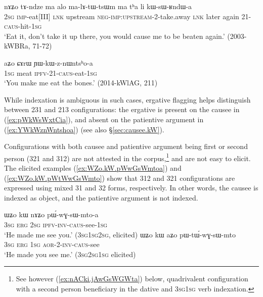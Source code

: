\begin{exe}
	\ex \label{ex:kWsWRndWa}
	\gll  nɤʑo tɤ-ndze ma alo ma-lɤ-tɯ-tsɯm ma tʰa li kɯ-sɯ-ʁndɯ-a \\
	\textsc{2sg} \textsc{imp}-eat[III] \textsc{lnk} upstream \textsc{neg}-\textsc{imp}:\textsc{upstream}-2-take.away \textsc{lnk} later again 2\fl{}1-\textsc{caus}-hit-\textsc{1sg} \\
	\glt  `Eat it, don't take it up there, you would cause me to be beaten again.' (2003-kWBRa, 71-72)
\end{exe}

\begin{exe}
	\ex \label{ex:YWkWznWntshoa}
	\gll aʑo ɕɤrɯ ɲɯ-kɯ-z-nɯntsʰo-a \\
	\textsc{1sg} meat \textsc{ipfv}-2\fl{}1-\textsc{caus}-eat-\textsc{1sg} \\
	\glt `You make me eat the bones.' (2014-kWlAG, 211)
\end{exe}

While indexation is ambiguous in such cases, ergative flagging helps distinguish between 2\fl{}3\fl{}1  and 2\fl{}1\fl{}3 configurations: the ergative is present on the causee in (\ref{ex:pWkWsWxtCia}), and absent on the patientive argument in (\ref{ex:YWkWznWntshoa}) (see also §\ref{sec:causee.kW}).

Configurations with both causee and patientive argument being first or second person (3\fl{}2\fl{}1 and 3\fl{}1\fl{}2) are not attested in the corpus,\footnote{See however (\ref{ex:nACki.jAwGsWGWta}) below, quadrivalent configuration with a second person beneficiary in the dative and 3\textsc{sg}\fl{}1\textsc{sg} verb indexation.} and are not easy to elicit. The elicited examples (\ref{ex:WZo.kW.pWwGsWmtoa}) and (\ref{ex:WZo.kW.pWtWwGsWmto}) show that 3\fl{}1\fl{}2 and 3\fl{}2\fl{}1 configurations are expressed using mixed 3\fl{}1 and 3\fl{}2 forms, respectively. In other words, the causee is indexed as object, and the patientive argument is not indexed.

\begin{exe}
	\ex 
	\begin{xlist}
		\ex \label{ex:WZo.kW.pWwGsWmtoa}
		\gll ɯʑo kɯ nɤʑo pɯ́-wɣ-sɯ-mto-a \\
		\textsc{3sg} \textsc{erg} \textsc{2sg} \textsc{ipfv}-\textsc{inv}-\textsc{caus}-see-\textsc{1sg} \\
		\glt `He made me see you.' (3\textsc{sg}\fl{}1\textsc{sg}\fl{}2\textsc{sg}, elicited)
		\ex \label{ex:WZo.kW.pWtWwGsWmto}
		\gll ɯʑo kɯ aʑo pɯ-tɯ́-wɣ-sɯ-mto \\
		\textsc{3sg} \textsc{erg} \textsc{1sg} \textsc{aor}-2-\textsc{inv}-\textsc{caus}-see \\
		\glt `He made you see me.'  (3\textsc{sg}\fl{}2\textsc{sg}\fl{}1\textsc{sg} elicited)
	\end{xlist}
\end{exe}

